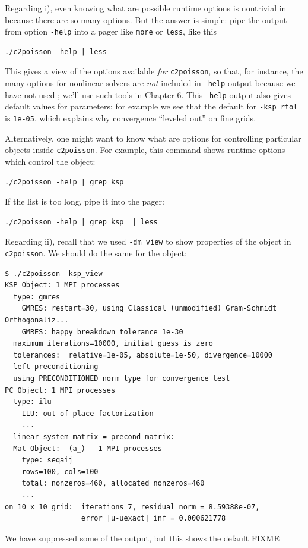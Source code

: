 Regarding i), even knowing what are possible runtime options is nontrivial in \PETSc because there are so many options.  But the answer is simple: pipe the output from option \texttt{-help} into a pager like \texttt{more} or \texttt{less}, like this
\begin{Verbatim}[fontsize=\small]
./c2poisson -help | less
\end{Verbatim}
This gives a view of the options available \emph{for} \texttt{c2poisson}, so that, for instance, the many options for nonlinear solvers are \emph{not} included in \texttt{-help} output because we have not used \pSNES; we'll use such tools in Chapter 6.  This \texttt{-help} output also gives default values for parameters; for example we see that the default for \texttt{-ksp\_rtol} is \texttt{1e-05}, which explains why convergence ``leveled out'' on fine grids.

Alternatively, one might want to know what are options for controlling particular objects inside \texttt{c2poisson}.  For example, this command shows runtime options which control the \pKSP object:
\begin{Verbatim}[fontsize=\small]
./c2poisson -help | grep ksp_
\end{Verbatim}
If the list is too long, pipe it into the pager:
\begin{Verbatim}[fontsize=\small]
./c2poisson -help | grep ksp_ | less
\end{Verbatim}

Regarding ii), recall that we used \texttt{-dm\_view} to show properties of the \pDM object in \texttt{c2poisson}.  We should do the same for the \pKSP object:
\begin{Verbatim}[fontsize=\small]
$ ./c2poisson -ksp_view
KSP Object: 1 MPI processes
  type: gmres
    GMRES: restart=30, using Classical (unmodified) Gram-Schmidt Orthogonaliz...
    GMRES: happy breakdown tolerance 1e-30
  maximum iterations=10000, initial guess is zero
  tolerances:  relative=1e-05, absolute=1e-50, divergence=10000
  left preconditioning
  using PRECONDITIONED norm type for convergence test
PC Object: 1 MPI processes
  type: ilu
    ILU: out-of-place factorization
    ...
  linear system matrix = precond matrix:
  Mat Object:  (a_)   1 MPI processes
    type: seqaij
    rows=100, cols=100
    total: nonzeros=460, allocated nonzeros=460
    ...
on 10 x 10 grid:  iterations 7, residual norm = 8.59388e-07,
                  error |u-uexact|_inf = 0.000621778
\end{Verbatim}
We have suppressed some of the output, but this shows the default FIXME

